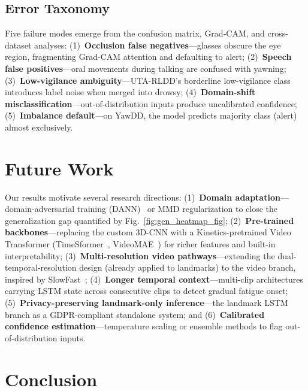 \documentclass[journal]{IEEEtran}
\begin{document}
\subsection{Error Taxonomy}
\label{sec:error_taxonomy}
Five failure modes emerge from the confusion matrix, Grad-CAM, and cross-dataset analyses: (1)~\textbf{Occlusion false negatives}---glasses obscure the eye region, fragmenting Grad-CAM attention and defaulting to alert; (2)~\textbf{Speech false positives}---oral movements during talking are confused with yawning; (3)~\textbf{Low-vigilance ambiguity}---UTA-RLDD's borderline low-vigilance class introduces label noise when merged into drowsy; (4)~\textbf{Domain-shift misclassification}---out-of-distribution inputs produce uncalibrated confidence; (5)~\textbf{Imbalance default}---on YawDD, the model predicts majority class (alert) almost exclusively.

\section{Future Work}
\label{sec:future}

Our results motivate several research directions: (1)~\textbf{Domain adaptation}---domain-adversarial training (DANN)~\cite{ganin2016} or MMD regularization to close the generalization gap quantified by Fig.~\ref{fig:gen_heatmap_fig}; (2)~\textbf{Pre-trained backbones}---replacing the custom 3D-CNN with a Kinetics-pretrained Video Transformer (TimeSformer~\cite{bertasius2021}, VideoMAE~\cite{tong2022}) for richer features and built-in interpretability; (3)~\textbf{Multi-resolution video pathways}---extending the dual-temporal-resolution design (already applied to landmarks) to the video branch, inspired by SlowFast~\cite{feichtenhofer2019}; (4)~\textbf{Longer temporal context}---multi-clip architectures carrying LSTM state across consecutive clips to detect gradual fatigue onset; (5)~\textbf{Privacy-preserving landmark-only inference}---the landmark LSTM branch as a GDPR-compliant standalone system; and (6)~\textbf{Calibrated confidence estimation}---temperature scaling or ensemble methods to flag out-of-distribution inputs.

\section{Conclusion}
\label{sec:conclusion}
\end{document}
